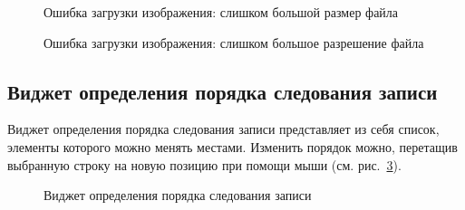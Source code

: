 \begin{figure}[H]
	\caption{Ошибка загрузки изображения: слишком большой размер файла}
	\label{img:widget:file_upload_size_error}
\end{figure}

\begin{figure}[H]
	\caption{Ошибка загрузки изображения: слишком большое разрешение файла}
	\label{img:widget:file_upload_dimension_errorr}
\end{figure}	

\subsection{Виджет определения порядка следования записи}
\label{widget:ordering}
Виджет определения порядка следования записи представляет из себя список, элементы которого можно менять местами. Изменить порядок можно, перетащив выбранную строку на новую позицию при помощи мыши (см. рис.~\ref{img:widgect:ordered_list}).

\begin{figure}[H]
	\caption{Виджет определения порядка следования записи}
	\label{img:widgect:ordered_list}
\end{figure}

